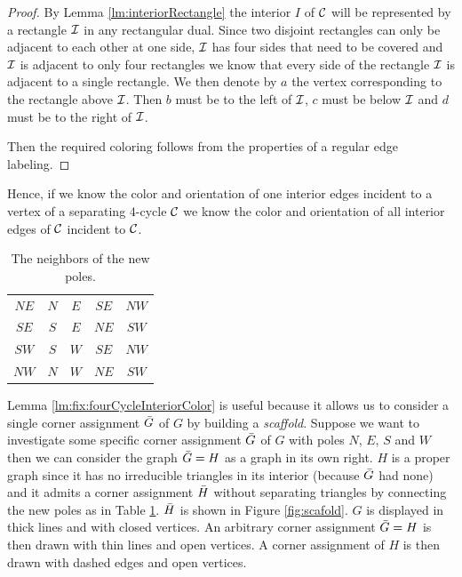  \begin{proof}
  By Lemma \ref{lm:interiorRectangle} the interior $I$ of $\mathcal{C}$ will be represented by a rectangle $\mathcal{I}$ in any rectangular dual. Since two disjoint rectangles can only be adjacent to each other at one side, $\mathcal{I}$ has four sides that need to be covered and $\mathcal{I}$ is adjacent to only four rectangles we know that every side of the rectangle $\mathcal{I}$ is adjacent to a single rectangle. We then denote by $a$ the vertex corresponding to the rectangle above $\mathcal{I}$. Then $b$ must be to the left of $\mathcal{I}$, $c$ must be below $\mathcal{I}$ and $d$ must be to the right of $\mathcal{I}$.

  Then the required coloring follows from the properties of a regular edge labeling.

  \end{proof}

  Hence, if we know the color and orientation of one interior edges incident to a vertex of a separating $4$-cycle $\mathcal{C}$ we know the color and orientation of all interior edges of $\mathcal{C}$ incident to $\mathcal{C}$.

  \begin{table}
    \centering
    \begin{tabular}{c|| c c c c}
      $NE$ & $N$ & $ E$ & $ SE$ & $ NW$ \\
      $SE$ & $S$ & $ E$ & $ NE$ & $ SW$\\
      $SW$ & $S$ & $ W$ & $ SE$ & $ NW$\\
      $NW$ & $N$ & $ W$ & $ NE$ & $ SW$\\
    \end{tabular}
    \caption{The neighbors of the new poles.}
    \label{tab:scaffold}
  \end{table}

  Lemma \ref{lm:fix:fourCycleInteriorColor} is useful because it allows us to consider a single corner assignment $\bar{G}$ of $G$ by building a \emph{scaffold}. Suppose we want to investigate some specific corner assignment $\bar{G}$ of $G$ with poles $N$, $E$, $S$ and $W$ then we can consider the graph $\bar{G} = H$ as a graph in its own right.
   $H$ is a proper graph since it has no irreducible triangles in its interior (because $\bar{G}$ had none) and it admits a corner assignment $\bar{H}$ without separating triangles by connecting the new poles as in Table \ref{tab:scaffold}. $\bar{H}$ is shown in Figure \ref{fig:scafold}. $G$ is displayed in thick lines and with closed vertices. An arbitrary corner assignment $\bar{G} =H$ is then drawn with thin lines and open vertices. A corner assignment of $H$ is then drawn with dashed edges and open vertices.

